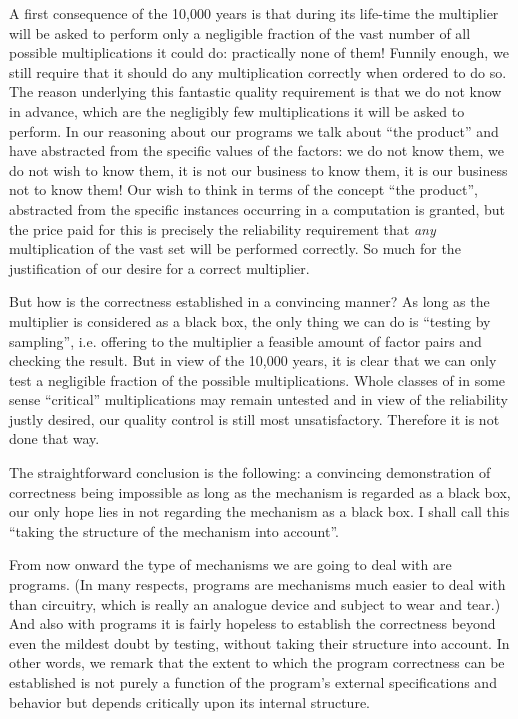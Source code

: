 A first consequence of the 10,000 years is that during its life-time the multiplier will be asked to perform only a negligible fraction of the vast number of all possible multiplications it could do: practically none of them! Funnily enough, we still require that it should do any multiplication correctly when ordered to do so. The reason underlying this fantastic quality requirement is that we do not know in advance, which are the negligibly few multiplications it will be asked to perform. In our reasoning about our programs we talk about ``the product'' and have abstracted from the specific values of the factors: we do not know them, we do not wish to know them, it is not our business to know them, it is our business not to know them! Our wish to think in terms of the concept ``the product'', abstracted from the specific instances occurring in a computation is granted, but the price paid for this is precisely the reliability requirement that \textit{any} multiplication of the vast set will be performed correctly. So much for the justification of our desire for a correct multiplier.

But how is the correctness established in a convincing manner? As long as the multiplier is considered as a black box, the only thing we can do is ``testing by sampling'', i.e. offering to the multiplier a feasible amount of factor pairs and checking the result. But in view of the 10,000 years, it is clear that we can only test a negligible fraction of the possible multiplications. Whole classes of in some sense ``critical'' multiplications may remain untested and in view of the reliability justly desired, our quality control is still most unsatisfactory. Therefore it is not done that way.

The straightforward conclusion is the following: a convincing demonstration of correctness being impossible as long as the mechanism is regarded
as a black box, our only hope lies in not regarding the mechanism as a black box. I shall call this ``taking the structure of the mechanism into account''.

From now onward the type of mechanisms we are going to deal with are programs. (In many respects, programs are mechanisms much easier to deal with than circuitry, which is really an analogue device and subject to wear and tear.) And also with programs it is fairly hopeless to establish the correctness beyond even the mildest doubt by testing, without taking their structure into account. In other words, we remark that the extent to which the program correctness can be established is not purely a function of the program's external specifications and behavior but depends critically upon its internal structure.

